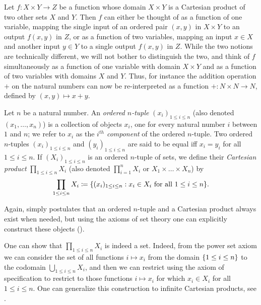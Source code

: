 \begin{note}
  Let \(f : X \times Y \to Z\) be a function whose domain \(X \times Y\) is a Cartesian product of two other sets \(X\) and \(Y\).
  Then \(f\) can either be thought of as a function of one variable, mapping the single input of an ordered pair \((x, y)\) in \(X \times Y\) to an output \(f(x, y)\) in \(Z\), or as a function of two variables, mapping an input \(x \in X\) and another input \(y \in Y\) to a single output \(f(x, y)\) in \(Z\).
  While the two notions are technically different, we will not bother to distinguish the two, and think of \(f\) simultaneously as a function of one variable with domain \(X \times Y\) and as a function of two variables with domains \(X\) and \(Y\).
  Thus, for instance the addition operation \(+\) on the natural numbers can now be re-interpreted as a function \(+ : N \times N \to N\), defined by \((x, y) \mapsto x + y\).
\end{note}

\setcounter{thm}{6}
\begin{defn}\label{i:3.5.7}
  Let \(n\) be a natural number.
  An \emph{ordered \(n\)-tuple} \((x_i)_{1 \leq i \leq n}\) (also denoted \((x_1, \dots, x_n)\)) is a collection of objects \(x_i\), one for every natural number \(i\) between \(1\) and \(n\);
  we refer to \(x_i\) as the \emph{\(i^{th}\) component} of the ordered \(n\)-tuple.
  Two ordered \(n\)-tuples \((x_i)_{1 \leq i \leq n}\) and \((y_i)_{1 \leq i \leq n}\) are said to be equal iff \(x_i = y_i\) for all \(1 \leq i \leq n\).
  If \((X_i)_{1 \leq i \leq n}\) is an ordered \(n\)-tuple of sets, we define their \emph{Cartesian product} \(\prod_{1 \leq i \leq n} X_i\) (also denoted \(\prod_{i=1}^n X_i\) or \(X_1 \times \dots \times X_n\)) by
  \[
    \prod_{1 \leq i \leq n} X_i \coloneqq \set{(x_i)_{1 \leq i \leq n} : x_i \in X_i \text{ for all } 1 \leq i \leq n}.
  \]
\end{defn}

\begin{note}
  Again,  simply postulates that an ordered \(n\)-tuple and a Cartesian product always exist when needed, but using the axioms of set theory one can explicitly construct these objects ().
\end{note}

\begin{rmk}\label{i:3.5.8}
  One can show that \(\prod_{1 \leq i \leq n} X_i\) is indeed a set.
  Indeed, from the power set axiom we can consider the set of all functions \(i \mapsto x_i\) from the domain \(\left\lbrace1 \leq i \leq n\right\rbrace\) to the codomain \(\bigcup_{1 \leq i \leq n} X_i\), and then we can restrict using the axiom of specification to restrict to those functions \(i \mapsto x_i\) for which \(x_i \in X_i\) for all \(1 \leq i \leq n\).
  One can generalize this construction to infinite Cartesian products, see .
\end{rmk}

